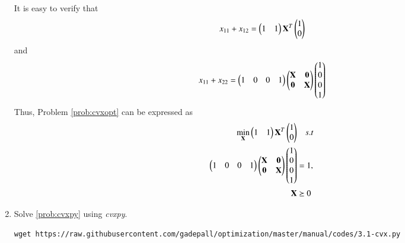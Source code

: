 \documentclass[journal,12pt,twocolumn]{IEEEtran}
\renewcommand\thesection{\arabic{section}}
\begin{document}
\begin{enumerate}[label=\thesection.\arabic*,ref=\thesection.\theenumi]
\solution
It is easy to verify that
\begin{equation}
x_{11} + x_{12} = 
\begin{pmatrix}
1 & 1
\end{pmatrix}
\mathbf{X}^{T}
\begin{pmatrix}
1 
\\
0
\end{pmatrix}
\end{equation}
and
\begin{equation}
x_{11} + x_{22} = 
\begin{pmatrix}
1 & 0 & 0 & 1
\end{pmatrix}
\begin{pmatrix}
\mathbf{X} & \mathbf{0} \\
\mathbf{0} & \mathbf{X}
\end{pmatrix}
\begin{pmatrix}
1
\\
0 
\\
0
\\
1
\end{pmatrix}
\end{equation}
%
Thus, Problem \ref{prob:cvxopt} can be expressed as
\begin{equation}
\begin{split}
\min_{\mbf{X}} 
\begin{pmatrix}
1 & 1
\end{pmatrix}
\mbf{X}^{T}
\begin{pmatrix}
1 
\\
0
\end{pmatrix}
& \quad s.t
\\
\begin{pmatrix}
1 & 0 & 0 & 1
\end{pmatrix}
\begin{pmatrix}
\mbf{X} & \mbf{0} \\
\mbf{0} & \mbf{X}
\end{pmatrix}
\begin{pmatrix}
1
\\
0 
\\
0
\\
1
\end{pmatrix}
&=1,
\\
\mbf{X}
 & \succeq 0 
\end{split}
\label{prob:cvxpy}
\end{equation}
%	
\item
Solve \eqref{prob:cvxpy} using {\em cvxpy}.

%
\solution
\begin{lstlisting}
wget https://raw.githubusercontent.com/gadepall/optimization/master/manual/codes/3.1-cvx.py
\end{lstlisting}


\end{enumerate}
\end{document}
